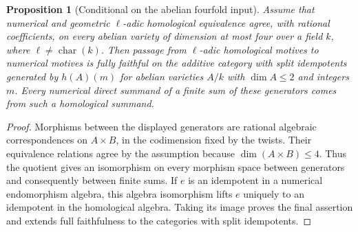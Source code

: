 \documentclass[11pt,a4paper]{article}
\newtheorem{proposition}[theorem]{Proposition}
\theoremstyle{definition}
\begin{document}
\begin{proposition}[Conditional on the abelian fourfold input]
Assume that numerical and geometric $\ell$-adic homological equivalence agree, with rational coefficients, on every abelian variety of dimension at most four over a field $k$, where $\ell\ne\operatorname{char}(k)$. Then passage from $\ell$-adic homological motives to numerical motives is fully faithful on the additive category with split idempotents generated by $h(A)(m)$ for abelian varieties $A/k$ with $\dim A\le2$ and integers $m$. Every numerical direct summand of a finite sum of these generators comes from such a homological summand.
\end{proposition}
\begin{proof}
Morphisms between the displayed generators are rational algebraic correspondences on $A\times B$, in the codimension fixed by the twists. Their equivalence relations agree by the assumption because $\dim(A\times B)\le4$. Thus the quotient gives an isomorphism on every morphism space between generators and consequently between finite sums. If $e$ is an idempotent in a numerical endomorphism algebra, this algebra isomorphism lifts $e$ uniquely to an idempotent in the homological algebra. Taking its image proves the final assertion and extends full faithfulness to the categories with split idempotents.
\end{proof}
\end{document}
